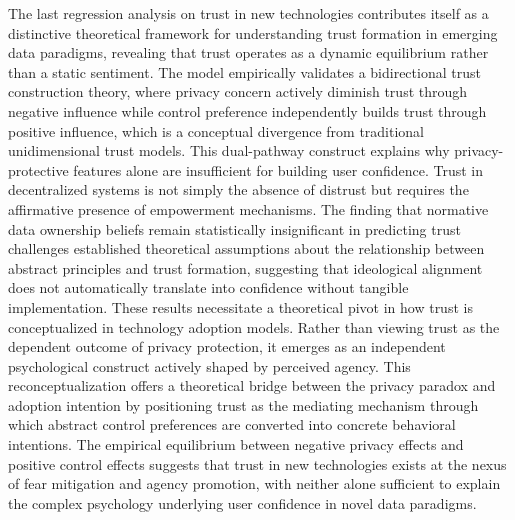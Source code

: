	The last regression analysis on trust in new technologies contributes itself as a distinctive theoretical framework for understanding trust formation in emerging data paradigms, revealing that trust operates as a dynamic equilibrium rather than a static sentiment. The model empirically validates a bidirectional trust construction theory, where privacy concern actively diminish trust through negative influence while control preference independently builds trust through positive influence, which is a conceptual divergence from traditional unidimensional trust models. This dual-pathway construct explains why privacy-protective features alone are insufficient for building user confidence. Trust in decentralized systems is not simply the absence of distrust but requires the affirmative presence of empowerment mechanisms. The finding that normative data ownership beliefs remain statistically insignificant in predicting trust challenges established theoretical assumptions about the relationship between abstract principles and trust formation, suggesting that ideological alignment does not automatically translate into confidence without tangible implementation. These results necessitate a theoretical pivot in how trust is conceptualized in technology adoption models. Rather than viewing trust as the dependent outcome of privacy protection, it emerges as an independent psychological construct actively shaped by perceived agency. This reconceptualization offers a theoretical bridge between the privacy paradox and adoption intention by positioning trust as the mediating mechanism through which abstract control preferences are converted into concrete behavioral intentions. The empirical equilibrium between negative privacy effects and positive control effects suggests that trust in new technologies exists at the nexus of fear mitigation and agency promotion, with neither alone sufficient to explain the complex psychology underlying user confidence in novel data paradigms.

